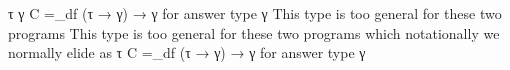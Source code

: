\documentclass[screen,anonymous,review,draft,natbib=false]{acmart} %
\newcommand{\meta}[2]{[\textsc{#1}: \emph{#2}]}
\newcommand{\todo}[1]{\textcolor{red}{\meta{TODO}{#1}}}
\begin{document}
 τ γ C =_df (τ → γ) → γ for answer type γ                                                                         This type is too general for these two programs  This type is too general for these two programs 
                                                                         which notationally we normally elide as                                                                                                   
 τ C =_df (τ → γ) → γ for answer type γ                                                                                                                                                                            














\end{document}
